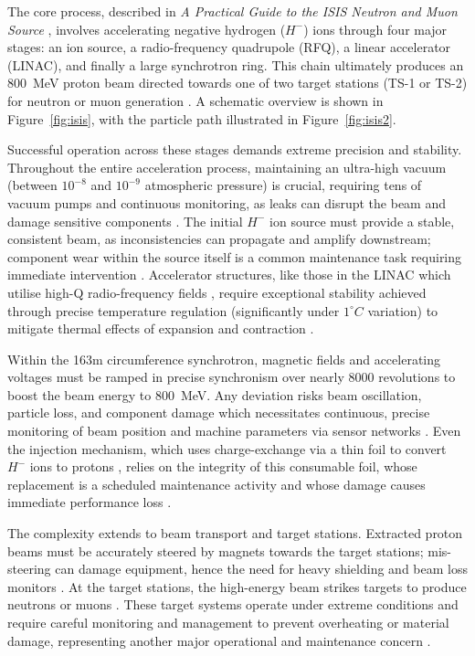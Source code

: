 \documentclass[10pt,oneside]{report}
\begin{document}
The core process, described in \textit{A Practical Guide to the ISIS Neutron and Muon Source} \cite{2021practicalguide}, involves accelerating negative hydrogen ($H^-$) ions through four major stages: an ion source, a radio-frequency quadrupole (RFQ), a linear accelerator (LINAC), and finally a large synchrotron ring. This chain ultimately produces an 800~MeV proton beam directed towards one of two target stations (TS-1 or TS-2) for neutron or muon generation \cite{2021practicalguide}. A schematic overview is shown in Figure~\ref{fig:isis}, with the particle path illustrated in Figure~\ref{fig:isis2}.

Successful operation across these stages demands extreme precision and stability. Throughout the entire acceleration process, maintaining an ultra-high vacuum (between $10^{-8}$ and $10^{-9}$ atmospheric pressure) is crucial, requiring tens of vacuum pumps and continuous monitoring, as leaks can disrupt the beam and damage sensitive components \cite{2021practicalguide}. The initial $H^-$ ion source must provide a stable, consistent beam, as inconsistencies can propagate and amplify downstream; component wear within the source itself is a common maintenance task requiring immediate intervention \cite{2021practicalguide}. Accelerator structures, like those in the LINAC which utilise high-Q radio-frequency fields \cite{michael2006electronic}, require exceptional stability achieved through precise temperature regulation (significantly under $1^\circ C$ variation) to mitigate thermal effects of expansion and contraction \cite{2021practicalguide}.

Within the 163m circumference synchrotron, magnetic fields and accelerating voltages must be ramped in precise synchronism over nearly 8000 revolutions to boost the beam energy to 800~MeV. Any deviation risks beam oscillation, particle loss, and component damage which necessitates continuous, precise monitoring of beam position and machine parameters via sensor networks \cite{2021practicalguide}. Even the injection mechanism, which uses charge-exchange via a thin foil to convert $H^-$ ions to protons \cite{2021practicalguide, ankenbrandt1980h}, relies on the integrity of this consumable foil, whose replacement is a scheduled maintenance activity and whose damage causes immediate performance loss \cite{2021practicalguide}.

The complexity extends to beam transport and target stations. Extracted proton beams must be accurately steered by magnets towards the target stations; mis-steering can damage equipment, hence the need for heavy shielding and beam loss monitors \cite{2021practicalguide}. At the target stations, the high-energy beam strikes targets to produce neutrons or muons \cite{sharma2001nuclear, 2021practicalguide}. These target systems operate under extreme conditions and require careful monitoring and management to prevent overheating or material damage, representing another major operational and maintenance concern \cite{2021practicalguide}.
\end{document}
